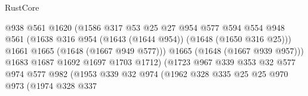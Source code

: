 \begin{lexlean}{RustCore}
\begin{coremodule}
                                          @938
                                          @561
                                          @1620
                                          (@1586
                                            @317
                                            @53
                                            @25
                                            @27
                                            @954
                                            @577
                                            @594
                                            @554
                                            @948
                                            @561
                                            (@1638
                                              @316
                                              @954
                                              (@1643 (@1644 @954))
                                              (@1648 (@1650 @316 @25)))
                                            @1661
                                            @1665
                                            (@1648 (@1667 @949 @577)))
                                          @1665
                                          (@1648 (@1667 @939 @957)))
                                        @1683
                                        @1687
                                        @1692
                                        @1697
                                        @1703
                                        @1712)
                                      (@1723
                                        @967
                                        @339
                                        @353
                                        @32
                                        @577
                                        @974
                                        @577
                                        @982
                                        (@1953
                                          @339
                                          @32
                                          @974
                                          (@1962
                                            @328
                                            @335
                                            @25
                                            @25
                                            @970
                                            @973
                                            (@1974
                                              @328
                                              @337

\end{coremodule}
\end{lexlean}
